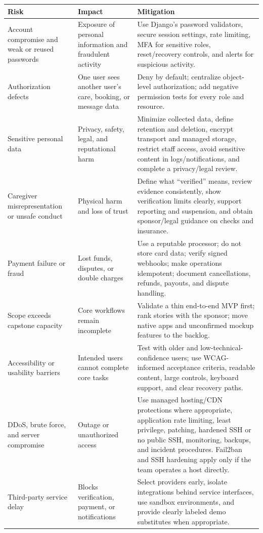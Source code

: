 \documentclass[11pt]{article}
\begin{document}
\begin{longtable}{p{}p{}p{}}
\toprule
\textbf{Risk} & \textbf{Impact} & \textbf{Mitigation} \\
\midrule
Account compromise and weak or reused passwords & Exposure of personal information and fraudulent activity & Use Django's password validators, secure session settings, rate limiting, MFA for sensitive roles, reset/recovery controls, and alerts for suspicious activity. \\
\addlinespace
Authorization defects & One user sees another user's care, booking, or message data & Deny by default; centralize object-level authorization; add negative permission tests for every role and resource. \\
\addlinespace
Sensitive personal data & Privacy, safety, legal, and reputational harm & Minimize collected data, define retention and deletion, encrypt transport and managed storage, restrict staff access, avoid sensitive content in logs/notifications, and complete a privacy/legal review. \\
\addlinespace
Caregiver misrepresentation or unsafe conduct & Physical harm and loss of trust & Define what ``verified'' means, review evidence consistently, show verification limits clearly, support reporting and suspension, and obtain sponsor/legal guidance on checks and insurance. \\
\addlinespace
Payment failure or fraud & Lost funds, disputes, or double charges & Use a reputable processor; do not store card data; verify signed webhooks; make operations idempotent; document cancellations, refunds, payouts, and dispute handling. \\
\addlinespace
Scope exceeds capstone capacity & Core workflows remain incomplete & Validate a thin end-to-end MVP first; rank stories with the sponsor; move native apps and unconfirmed mockup features to the backlog. \\
\addlinespace
Accessibility or usability barriers & Intended users cannot complete core tasks & Test with older and low-technical-confidence users; use WCAG-informed acceptance criteria, readable content, large controls, keyboard support, and clear recovery paths. \\
\addlinespace
DDoS, brute force, and server compromise & Outage or unauthorized access & Use managed hosting/CDN protections where appropriate, application rate limiting, least privilege, patching, hardened SSH or no public SSH, monitoring, backups, and incident procedures. Fail2ban and SSH hardening apply only if the team operates a host directly. \\
\addlinespace
Third-party service delay & Blocks verification, payment, or notifications & Select providers early, isolate integrations behind service interfaces, use sandbox environments, and provide clearly labeled demo substitutes when appropriate. \\
\bottomrule
\end{longtable}
\end{document}
